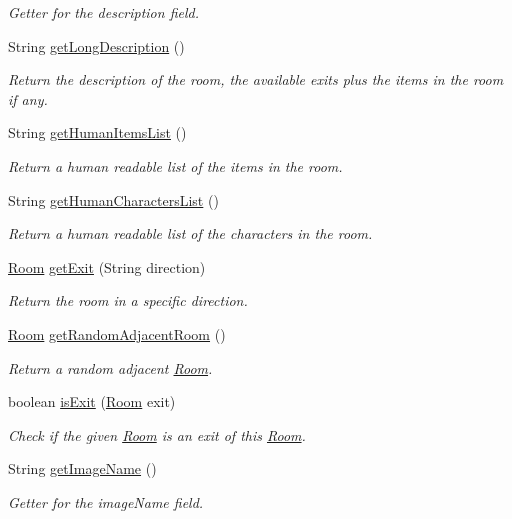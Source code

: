 \begin{DoxyCompactItemize}
\begin{DoxyCompactList}\small\item\em Getter for the description field. \end{DoxyCompactList}\item 
String \hyperlink{classpkg__world_1_1Room_acc8ee9123c9a77428c1e66fbba34aeac}{get\-Long\-Description} ()
\begin{DoxyCompactList}\small\item\em Return the description of the room, the available exits plus the items in the room if any. \end{DoxyCompactList}\item 
String \hyperlink{classpkg__world_1_1Room_a3ea436ad00d00484b429992ef94535ac}{get\-Human\-Items\-List} ()
\begin{DoxyCompactList}\small\item\em Return a human readable list of the items in the room. \end{DoxyCompactList}\item 
String \hyperlink{classpkg__world_1_1Room_a1ddbdc5022f7f494ac6250ca3f42672c}{get\-Human\-Characters\-List} ()
\begin{DoxyCompactList}\small\item\em Return a human readable list of the characters in the room. \end{DoxyCompactList}\item 
\hyperlink{classpkg__world_1_1Room}{Room} \hyperlink{classpkg__world_1_1Room_ae05ae991a1692ffb29e8aef632d18b95}{get\-Exit} (String direction)
\begin{DoxyCompactList}\small\item\em Return the room in a specific direction. \end{DoxyCompactList}\item 
\hyperlink{classpkg__world_1_1Room}{Room} \hyperlink{classpkg__world_1_1Room_a00952ff3743ec6cd8d238dada7506f63}{get\-Random\-Adjacent\-Room} ()
\begin{DoxyCompactList}\small\item\em Return a random adjacent \hyperlink{classpkg__world_1_1Room}{Room}. \end{DoxyCompactList}\item 
boolean \hyperlink{classpkg__world_1_1Room_a305aab25719c2b75a0c28c9a53a3c9d3}{is\-Exit} (\hyperlink{classpkg__world_1_1Room}{Room} exit)
\begin{DoxyCompactList}\small\item\em Check if the given \hyperlink{classpkg__world_1_1Room}{Room} is an exit of this \hyperlink{classpkg__world_1_1Room}{Room}. \end{DoxyCompactList}\item 
String \hyperlink{classpkg__world_1_1Room_a5d1a496c1fd2e4ba73177e1182c9f4f1}{get\-Image\-Name} ()
\begin{DoxyCompactList}\small\item\em Getter for the image\-Name field. \end{DoxyCompactList}\end{DoxyCompactItemize}


